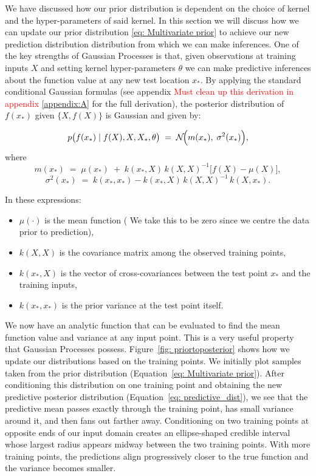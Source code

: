 \documentclass[11pt]{article}
\begin{document}
We have discussed how our prior distribution is dependent on the choice of kernel and the hyper-parameters of said kernel. In this section
we will discuss how we can update our prior distribution \ref{eq: Multivariate prior} to achieve our new prediction distribution distribution from which we can make
inferences. One of the key strengths of Gaussian Processes is that, given observations at training inputs \(X\) and setting kernel hyper-parameters \(\theta\)
we can make predictive inferences about the function value at any new test location \(x_*\).
By applying the standard conditional Gaussian formulas (see appendix \textcolor{red}{Must clean up this derivation in appendix} \ref{appendix:A} for the full derivation),
the posterior distribution of \(f(x_*)\) given \(\{X, f(X)\}\) is Gaussian and given by:

\begin{equation}
p\bigl(f(x_*) \mid f(X), X, X_*,\theta \bigr)
\;=\;
\mathcal{N}\!\Bigl(
m(x_*),\;\sigma^2(x_*)
\Bigr),
\label{eq: predictive_dist}
\end{equation}
\noindent
where
\begin{equation}
m(x_*) \;=\; \mu(x_*) \;+\;k(x_*, X)\,k(X, X)^{-1}\bigl[f(X) - \mu(X)\bigr],
\label{eq: predictive_mean}
\end{equation}
\begin{equation}
\sigma^2(x_*) \;=\;k(x_*, x_*) - k(x_*, X)\,k(X, X)^{-1}\,k(X, x_*).
\label{eq: predictive_variance}
\end{equation}

In these expressions:
\begin{itemize}
    \item \( \mu(\cdot) \) is the mean function ( We take this to be zero since we centre the data prior to prediction),
    \item \( k(X, X) \) is the covariance matrix among the observed training points,
    \item \( k(x_*, X) \) is the vector of cross-covariances between the test point \(x_*\) and the training inputs,
    \item \( k(x_*, x_*) \) is the prior variance at the test point itself.
\end{itemize}

\noindent
We now have an analytic function that can be evaluated to find the mean function value and variance at any input point.
This is a very useful property that Gaussian Processes possess. Figure~\ref{fig: priortoposterior} shows how we update our
distributions based on the training points. We initially plot samples taken from the prior distribution (Equation~\ref{eq: Multivariate prior}). 
After conditioning this distribution on one training point and obtaining the new predictive posterior distribution (Equation~\ref{eq: predictive_dist}), 
we see that the predictive mean passes exactly through the training point, has small variance around it, and then fans out farther away. 
Conditioning on two training points at opposite ends of our input domain creates an ellipse-shaped credible interval whose largest radius 
appears midway between the two training points. With more training points, the predictions align progressively closer to the true function 
and the variance becomes smaller.
\end{document}

